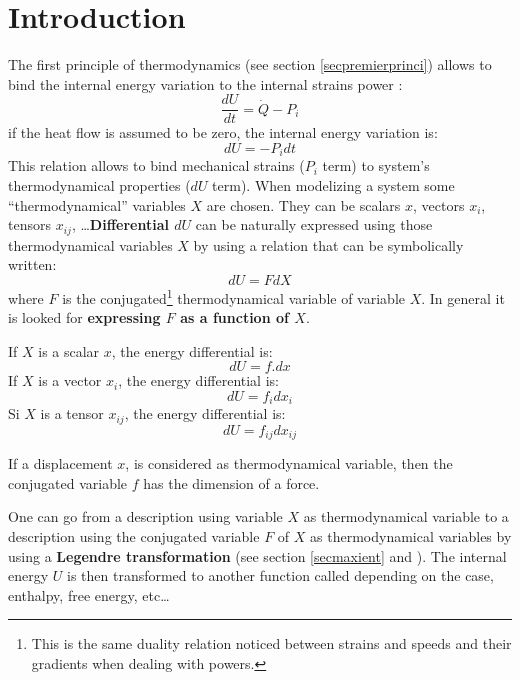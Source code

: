 \documentclass[12pt]{book}
\begin{document}
\section{Introduction}
The first principle of thermodynamics (see section \ref{secpremierprinci})
allows to bind the internal energy variation to the internal strains power
:
\begin{equation}
\frac{dU}{dt}=\dot Q -P_i
\end{equation}
if the heat flow is assumed to be zero, the internal energy variation is:
\begin{equation}
dU=-P_i dt
\end{equation}
This relation allows to bind mechanical strains ($P_i$ term) to
system's thermodynamical properties ($dU$ term). When modelizing a system some
``thermodynamical'' variables $X$ are chosen. They can be scalars $x$,
vectors $x_i$, tensors $x_{ij}$, \dots {\bf Differential $dU$} can be
naturally expressed using those thermodynamical variables $X$ by using a
relation that can be symbolically written:
\begin{equation}
dU=FdX
\end{equation}
where $F$ is the conjugated\footnote{%
This is
the same duality relation noticed between strains and speeds and their
gradients when dealing with powers.}%
 thermodynamical variable of variable
$X$. In general it is looked for {\bf expressing $F$ as a function of $X$}.
\begin{rem}
If $X$ is a scalar $x$, the energy differential is:
\begin{equation}
dU=f.dx
\end{equation}
If $X$ is a vector $x_i$, the energy differential is:
\begin{equation}
dU=f_idx_i
\end{equation}
Si $X$ is a tensor $x_{ij}$, the energy differential is:
\begin{equation}
dU=f_{ij}dx_{ij}
\end{equation}
\end{rem}
\begin{rem}
If a displacement $x$, is considered as thermodynamical variable, then the
conjugated variable $f$ has the dimension of a force.
\end{rem}
\begin{rem}
One can go from a description using variable $X$ as thermodynamical variable
to a description using the conjugated variable $F$ of $X$ as thermodynamical
variables by using a 
{\bf Legendre transformation} (see section \ref{secmaxient} 
and \cite{ph:physt:Diu89}).
The internal
energy $U$ is then transformed to another function called depending on the
case, enthalpy, free energy, etc\dots
\end{rem}
\end{document}
